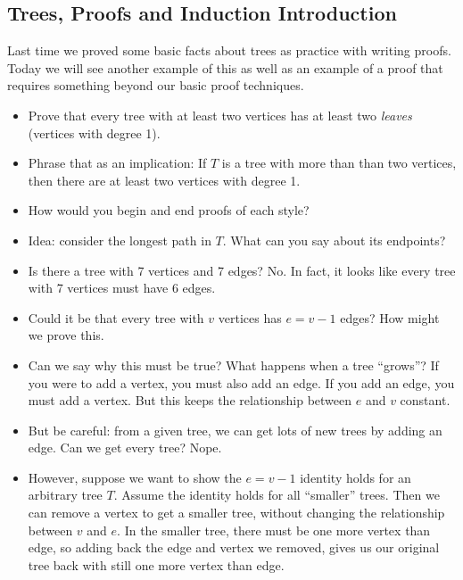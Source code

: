 \documentclass[12pt]{article}
\theoremstyle{plain}
\theoremstyle{definition}
\theoremstyle{remark}
\newcommand{\todayis}[1]{\clearpage{\rhead{\footnotesize #1}}}
\begin{document}
\todayis{Friday, September 7}

\subsection*{Trees, Proofs and Induction Introduction}

Last time we proved some basic facts about trees as practice with writing proofs.  Today we will see another example of this as well as an example of a proof that requires something beyond our basic proof techniques.

\begin{itemize}
  \item Prove that every tree with at least two vertices has at least two \emph{leaves} (vertices with degree 1).

  \item Phrase that as an implication: If $T$ is a tree with more than than two vertices, then there are at least two vertices with degree 1.

  \item How would you begin and end proofs of each style?

  \item Idea: consider the longest path in $T$.  What can you say about its endpoints?

  \item Is there a tree with 7 vertices and 7 edges?  No.  In fact, it looks like every tree with 7 vertices must have 6 edges.

  \item Could it be that every tree with $v$ vertices has $e = v-1$ edges?  How might we prove this.

  \item Can we say why this must be true?  What happens when a tree ``grows''?  If you were to add a vertex, you must also add an edge.  If you add an edge, you must add a vertex.  But this keeps the relationship between $e$ and $v$ constant.

  \item But be careful: from a given tree, we can get lots of new trees by adding an edge.  Can we get every tree?  Nope.

  \item However, suppose we want to show the $e=v-1$ identity holds for an arbitrary tree $T$.  Assume the identity holds for all ``smaller'' trees.  Then we can remove a vertex to get a smaller tree, without changing the relationship between $v$ and $e$.  In the smaller tree, there must be one more vertex than edge, so adding back the edge and vertex we removed, gives us our original tree back with still one more vertex than edge.


\end{itemize}
\end{document}
